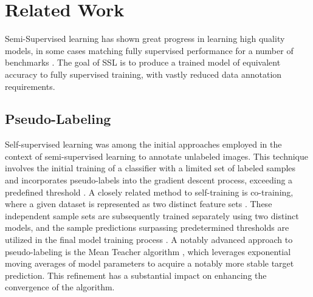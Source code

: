 \documentclass[10pt,twocolumn,letterpaper]{article}
\begin{document}


\section{Related Work}



Semi-Supervised learning has shown great progress in learning high quality models, in some cases matching fully supervised performance for a number of benchmarks \cite{zhang2021flexmatch}.
The goal of SSL is to produce a trained model of equivalent accuracy to fully supervised training, with vastly reduced data annotation requirements.

\subsection{Pseudo-Labeling}
Self-supervised learning was among the initial approaches employed in the context of semi-supervised learning to annotate unlabeled images. 
This technique involves the initial training of a classifier with a limited set of labeled samples and incorporates pseudo-labels into the gradient descent process, exceeding a predefined threshold \cite{yarowsky1995unsupervised, mcclosky2006reranking, olivier2006semi,zhai2019s4l,livieris2019predicting,rosenberg2005semi,menon2020deep}. 
A closely related method to self-training is co-training, where a given dataset is represented as two distinct feature sets \cite{blum1998combining}. 
These independent sample sets are subsequently trained separately using two distinct models, and the sample predictions surpassing predetermined thresholds are utilized in the final model training process \cite{blum1998combining,prakash2014survey}.
A notably advanced approach to pseudo-labeling is the Mean Teacher algorithm \cite{tarvainen2017mean}, which leverages exponential moving averages of model parameters to acquire a notably more stable target prediction. 
This refinement has a substantial impact on enhancing the convergence of the algorithm.
\end{document}
